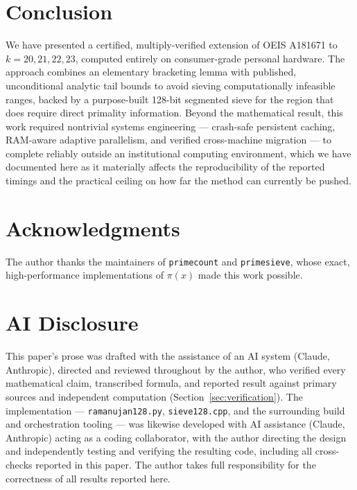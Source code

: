 \documentclass[11pt]{amsart}
\newcommand{\pcount}{\pi}
\begin{document}
\section{Conclusion}

We have presented a certified, multiply-verified extension of OEIS
A181671 to $k=20,21,22,23$, computed entirely on consumer-grade personal
hardware. The approach combines an elementary
bracketing lemma with published, unconditional analytic tail bounds to
avoid sieving computationally infeasible ranges, backed by a
purpose-built 128-bit segmented sieve for the region that does require
direct primality information. Beyond the mathematical result, this work
required nontrivial systems engineering --- crash-safe persistent
caching, RAM-aware adaptive parallelism, and verified cross-machine
migration --- to complete reliably outside an institutional computing
environment, which we have documented here as it materially affects the
reproducibility of the reported timings and the practical ceiling on
how far the method can currently be pushed.

\section*{Acknowledgments}

The author thanks the maintainers of \texttt{primecount} and
\texttt{primesieve}, whose exact, high-performance implementations of
$\pcount(x)$ made this work possible.

\section*{AI Disclosure}

This paper's prose was drafted with the assistance of an AI system
(Claude, Anthropic), directed and reviewed throughout by the author, who
verified every mathematical claim, transcribed formula, and reported
result against primary sources and independent computation
(Section~\ref{sec:verification}). The implementation ---
\texttt{ramanujan128.py}, \texttt{sieve128.cpp}, and the surrounding
build and orchestration tooling --- was likewise developed with AI
assistance (Claude, Anthropic) acting as a coding collaborator, with the
author directing the design and independently testing and verifying the
resulting code, including all cross-checks reported in this paper. The
author takes full responsibility for the correctness of all results
reported here.
\end{document}
